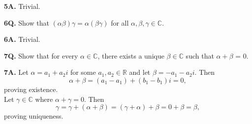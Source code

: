 \documentclass[12pt, letterpaper]{article}
\begin{document}
\textbf{5A.} Trivial.

\textbf{6Q.} Show that $(\alpha\beta)\gamma=\alpha(\beta\gamma)$ for all $\alpha,\beta,\gamma\in\mathbb{C}$.

\textbf{6A.} Trivial.

\textbf{7Q.} Show that for every $\alpha\in\mathbb{C}$, there exists a unique $\beta\in\mathbb{C}$ such that $\alpha+\beta$ = 0.

\textbf{7A.} Let $\alpha=a_1+a_2i$ for some $a_1,a_2\in\mathbb{R}$ and let $\beta = -a_1-a_2i$. Then
$$\alpha+\beta=(a_1-a_1)+(b_1-b_1)i=0,$$
proving existence. 
\\Let $\gamma\in\mathbb{C}$ where $\alpha+\gamma=0$. Then
$$\gamma = \gamma + (\alpha + \beta) = (\gamma + \alpha) +\beta = 0 + \beta = \beta,$$
proving uniqueness.
\end{document}
